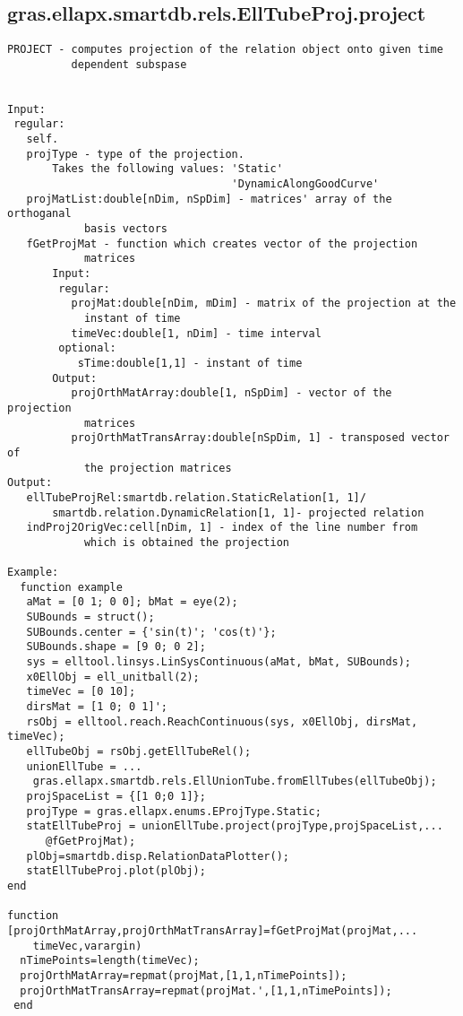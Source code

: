 \subsection{\texorpdfstring{gras.ellapx.smartdb.rels.EllTubeProj.project}{project}}\label{method:gras.ellapx.smartdb.rels.EllTubeProj.project}
\begin{verbatim}
PROJECT - computes projection of the relation object onto given time
          dependent subspase


Input:
 regular:
   self.
   projType - type of the projection.
       Takes the following values: 'Static'
                                   'DynamicAlongGoodCurve'
   projMatList:double[nDim, nSpDim] - matrices' array of the orthoganal
            basis vectors
   fGetProjMat - function which creates vector of the projection
            matrices
       Input:
        regular:
          projMat:double[nDim, mDim] - matrix of the projection at the
            instant of time
          timeVec:double[1, nDim] - time interval
        optional:
           sTime:double[1,1] - instant of time
       Output:
          projOrthMatArray:double[1, nSpDim] - vector of the projection
            matrices
          projOrthMatTransArray:double[nSpDim, 1] - transposed vector of
            the projection matrices
Output:
   ellTubeProjRel:smartdb.relation.StaticRelation[1, 1]/
       smartdb.relation.DynamicRelation[1, 1]- projected relation
   indProj2OrigVec:cell[nDim, 1] - index of the line number from
            which is obtained the projection

Example:
  function example
   aMat = [0 1; 0 0]; bMat = eye(2);
   SUBounds = struct();
   SUBounds.center = {'sin(t)'; 'cos(t)'};
   SUBounds.shape = [9 0; 0 2];
   sys = elltool.linsys.LinSysContinuous(aMat, bMat, SUBounds);
   x0EllObj = ell_unitball(2);
   timeVec = [0 10];
   dirsMat = [1 0; 0 1]';
   rsObj = elltool.reach.ReachContinuous(sys, x0EllObj, dirsMat, timeVec);
   ellTubeObj = rsObj.getEllTubeRel();
   unionEllTube = ...
    gras.ellapx.smartdb.rels.EllUnionTube.fromEllTubes(ellTubeObj);
   projSpaceList = {[1 0;0 1]};
   projType = gras.ellapx.enums.EProjType.Static;
   statEllTubeProj = unionEllTube.project(projType,projSpaceList,...
      @fGetProjMat);
   plObj=smartdb.disp.RelationDataPlotter();
   statEllTubeProj.plot(plObj);
end

function [projOrthMatArray,projOrthMatTransArray]=fGetProjMat(projMat,...
    timeVec,varargin)
  nTimePoints=length(timeVec);
  projOrthMatArray=repmat(projMat,[1,1,nTimePoints]);
  projOrthMatTransArray=repmat(projMat.',[1,1,nTimePoints]);
 end
\end{verbatim}
